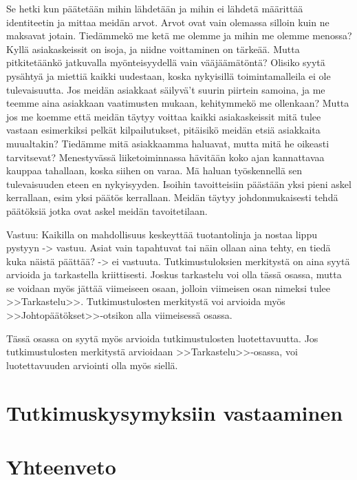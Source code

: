 \documentclass[finnish,12pt,a4paper,pdftex]{article}
\begin{document}
Se hetki kun päätetään mihin lähdetään ja mihin ei lähdetä määrittää identiteetin ja mittaa meidän arvot. Arvot ovat vain olemassa silloin kuin ne maksavat jotain. Tiedämmekö me ketä me olemme ja mihin me olemme menossa? Kyllä asiakaskeissit on isoja, ja niidne voittaminen on tärkeää. Mutta pitkitetäänkö jatkuvalla myönteisyydellä vain vääjäämätöntä? Olisiko syytä pysähtyä ja miettiä kaikki uudestaan, koska nykyisillä toimintamalleila ei ole tulevaisuutta. Jos meidän asiakkaat säilyvä't suurin piirtein samoina, ja me teemme aina asiakkaan vaatimusten mukaan, kehitymmekö me ollenkaan? Mutta jos me koemme että meidän täytyy voittaa kaikki asiakaskeissit mitä tulee vastaan esimerkiksi pelkät kilpailutukset, pitäisikö meidän etsiä asiakkaita muualtakin? Tiedämme mitä asiakkaamma haluavat, mutta mitä he oikeasti tarvitsevat? Menestyvässä liiketoiminnassa hävitään koko ajan kannattavaa kauppaa tahallaan, koska siihen on varaa. Mä haluan työskennellä sen tulevaisuuden eteen en nykyisyyden. Isoihin tavoitteisiin päästään yksi pieni askel kerrallaan, esim yksi päätös kerrallaan. Meidän täytyy johdonmukaisesti tehdä päätöksiä jotka ovat askel meidän tavoitetilaan.

Vastuu: Kaikilla on mahdollisuus keskeyttää tuotantolinja ja nostaa lippu pystyyn -> vastuu. Asiat vain tapahtuvat tai näin ollaan aina tehty, en tiedä kuka näistä päättää? -> ei vastuuta.
Tutkimustuloksien merkitystä on aina syytä arvioida ja tarkastella
kriittisesti.  Joskus tarkastelu voi olla tässä osassa, mutta se
voidaan myös jättää viimeiseen osaan, jolloin viimeisen osan nimeksi
tulee >>Tarkastelu>>. Tutkimustulosten merkitystä voi arvioida myös
>>Johtopäätökset>>-otsikon alla viimeisessä osassa. 

Tässä osassa on syytä myös arvioida tutkimustulosten luotettavuutta.
Jos tutkimustulosten merkitystä arvioidaan >>Tarkastelu>>-osassa,
voi luotettavuuden arviointi olla myös siellä. 

\clearpage

\section{Tutkimuskysymyksiin vastaaminen}

\section{Yhteenveto}
\end{document}
